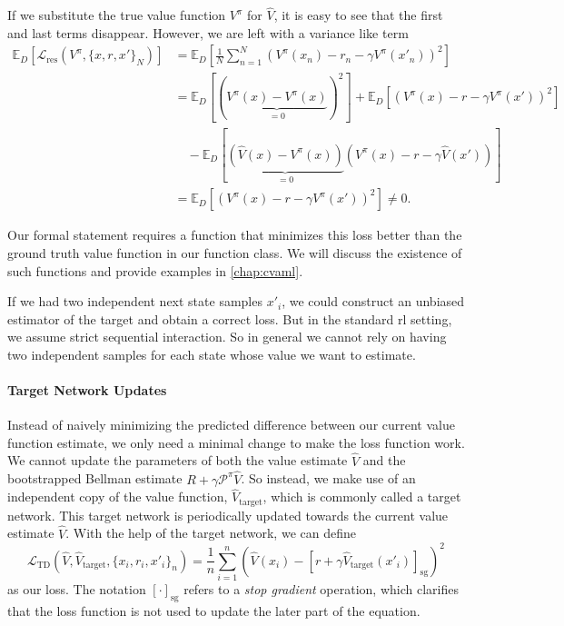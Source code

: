 If we substitute the true value function $V^\pi$ for $\hat{V}$, it is easy to see that the first and last terms disappear.
However, we are left with a variance like term
\begin{align}
    \mathbb{E}_{D} \left[\mathcal{L}_\mathrm{res}(V^\pi, \{x, r, x'\}_N)\right] &= \mathbb{E}_{D} \left[\frac{1}{N} \sum_{n=1}^N \left(V^\pi(x_n) - r_n - \gamma V^\pi(x'_n)\right)^2\right] \\
    &=\mathbb{E}_{D} \left[\left(\underbrace{V^\pi(x) - V^\pi(x)}_{=0}\right)^2\right] + \mathbb{E}_{D}\left[\left( V^\pi(x) - r - \gamma V^\pi(x')\right)^2\right] \\
    &\quad - \mathbb{E}_{D}\left[\underbrace{\left(\hat{V}(x) - V^\pi(x)\right)}_{=0}\left( V^\pi(x) - r - \gamma \hat{V}(x')\right)\right]\\
    &=\mathbb{E}_{D}\left[\left( V^\pi(x) - r - \gamma V^\pi(x')\right)^2\right] \neq 0.
\end{align}

Our formal statement requires a function that minimizes this loss better than the ground truth value function in our function class.
We will discuss the existence of such functions and provide examples in \autoref{chap:cvaml}.

If we had two independent next state samples $x'_i$, we could construct an unbiased estimator of the target and obtain a correct loss.
But in the standard \ac{rl} setting, we assume strict sequential interaction.
So in general we cannot rely on having two independent samples for each state whose value we want to estimate.

\paragraph{Target Network Updates}

Instead of naively minimizing the predicted difference between our current value function estimate, we only need a minimal change to make the loss function work.
We cannot update the parameters of both the value estimate $\hat{V}$ and the bootstrapped Bellman estimate $R + \gamma \mathcal{P}^\pi \hat{V}$.
So instead, we make use of an independent copy of the value function, $\hat{V}_\mathrm{target}$, which is commonly called a target network. 
This target network is periodically updated towards the current value estimate $\hat{V}$.
With the help of the target network, we can define
\[
    \mathcal{L}_\mathrm{TD}\left(\hat{V}, \hat{V}_\mathrm{target}, \{x_i, r_i, x'_i\}_{n}\right) = \frac{1}{n} \sum_{i=1}^n \left(\hat{V}(x_i) - \left[r + \gamma \hat{V}_\mathrm{target}(x'_i)\right]_\mathrm{sg}\right)^2
\]
as our loss.
The notation $[\cdot]_\mathrm{sg}$ refers to a \emph{stop gradient} operation, which clarifies that the loss function is not used to update the later part of the equation.

